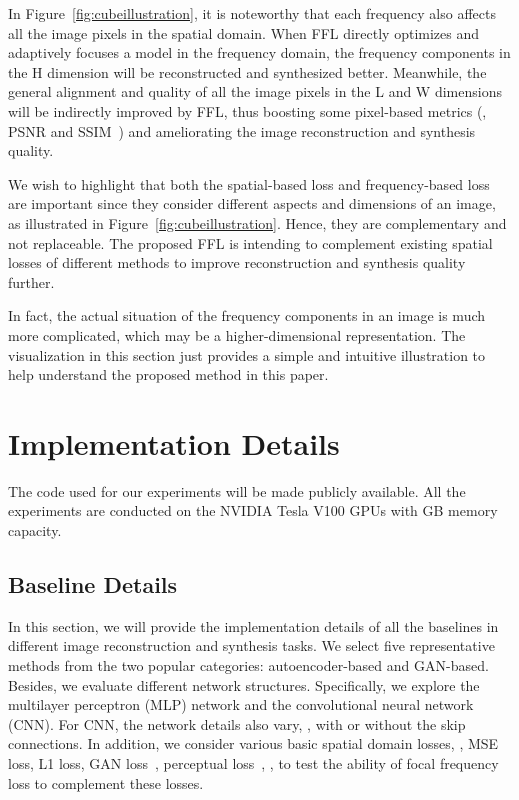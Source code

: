 \documentclass[10pt,twocolumn,letterpaper]{article}
\begin{document}
In Figure~\ref{fig:cubeillustration}, it is noteworthy that each frequency also affects all the image pixels in the spatial domain. When FFL directly optimizes and adaptively focuses a model in the frequency domain, the frequency components in the H dimension will be reconstructed and synthesized better. Meanwhile, the general alignment and quality of all the image pixels in the L and W dimensions will be indirectly improved by FFL, thus boosting some pixel-based metrics (\eg, PSNR and SSIM~\cite{ssim}) and ameliorating the image reconstruction and synthesis quality.

We wish to highlight that both the spatial-based loss and frequency-based loss are important since they consider different aspects and dimensions of an image, as illustrated in Figure~\ref{fig:cubeillustration}. Hence, they are complementary and not replaceable. The proposed FFL is intending to complement existing spatial losses of different methods to improve reconstruction and synthesis quality further.

In fact, the actual situation of the frequency components in an image is much more complicated, which may be a higher-dimensional representation. The visualization in this section just provides a simple and intuitive illustration to help understand the proposed method in this paper.



\section{Implementation Details}
\label{sec:implementation}
The code used for our experiments will be made publicly available.
All the experiments are conducted on the NVIDIA Tesla V100 GPUs with  GB memory capacity.

\subsection{Baseline Details}
\label{sec:baselinedetails}
In this section, we will provide the implementation details of all the baselines in different image reconstruction and synthesis tasks.
We select five representative methods from the two popular categories: autoencoder-based and GAN-based.
Besides, we evaluate different network structures. Specifically, we explore the multilayer perceptron (MLP) network and the convolutional neural network (CNN). For CNN, the network details also vary, \eg, with or without the skip connections.
In addition, we consider various basic spatial domain losses, \eg, MSE loss, L1 loss, GAN loss~\cite{GAN}, perceptual loss~\cite{perceptualloss}, \etc, to test the ability of focal frequency loss to complement these losses.
\end{document}
